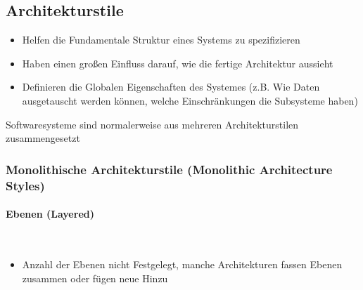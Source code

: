 \documentclass[ngerman,color=3b]{tuda_summary}
\begin{document}
\subsection{Architekturstile}
\begin{itemize}
    \item Helfen die Fundamentale Struktur eines Systems zu spezifizieren
    \item Haben einen großen Einfluss darauf, wie die fertige Architektur aussieht
    \item Definieren die Globalen Eigenschaften des Systemes (z.B. Wie Daten ausgetauscht werden können, welche Einschränkungen die Subsysteme haben)
\end{itemize}
Softwaresysteme sind normalerweise aus mehreren Architekturstilen zusammengesetzt
\clearpage
\subsubsection{Monolithische Architekturstile (Monolithic Architecture Styles)}
\paragraph{Ebenen (Layered)}\mbox{}\\
\begin{figure}[h]
    \centering
\end{figure}
\FloatBarrier
\begin{itemize}
    \item Anzahl der Ebenen nicht Festgelegt, manche Architekturen fassen Ebenen zusammen oder fügen neue Hinzu
\end{itemize}
\end{document}
